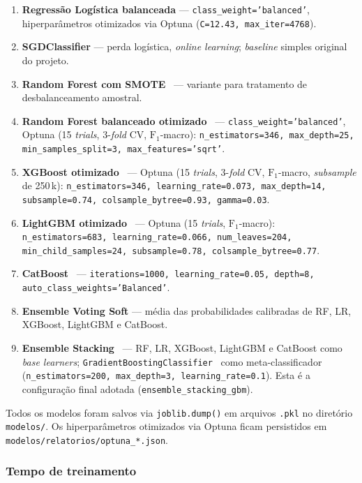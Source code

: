 \begin{enumerate}
  \item \textbf{Regressão Logística balanceada} --- \texttt{class\_weight='balanced'}, hiperparâmetros otimizados via Optuna (\texttt{C=12.43, max\_iter=4768}).
  \item \textbf{SGDClassifier} --- perda logística, \emph{online learning}; \emph{baseline} simples original do projeto.
  \item \textbf{Random Forest com SMOTE}~\cite{chawla2002smote} --- variante para tratamento de desbalanceamento amostral.
  \item \textbf{Random Forest balanceado otimizado}~\cite{breiman2001random} --- \texttt{class\_weight='balanced'}, Optuna (15 \emph{trials}, 3-\emph{fold} CV, \(\text{F}_1\)-macro): \texttt{n\_estimators=346, max\_depth=25, min\_samples\_split=3, max\_features='sqrt'}.
  \item \textbf{XGBoost otimizado}~\cite{chen2016xgboost} --- Optuna (15 \emph{trials}, 3-\emph{fold} CV, \(\text{F}_1\)-macro, \emph{subsample} de 250\,k): \texttt{n\_estimators=346, learning\_rate=0.073, max\_depth=14, subsample=0.74, colsample\_bytree=0.93, gamma=0.03}.
  \item \textbf{LightGBM otimizado}~\cite{ke2017lightgbm} --- Optuna (15 \emph{trials}, \(\text{F}_1\)-macro): \texttt{n\_estimators=683, learning\_rate=0.066, num\_leaves=204, min\_child\_samples=24, subsample=0.78, colsample\_bytree=0.77}.
  \item \textbf{CatBoost}~\cite{prokhorenkova2018catboost} --- \texttt{iterations=1000, learning\_rate=0.05, depth=8, auto\_class\_weights='Balanced'}.
  \item \textbf{Ensemble Voting Soft} --- média das probabilidades calibradas de RF, LR, XGBoost, LightGBM e CatBoost.
  \item \textbf{Ensemble Stacking}~\cite{wolpert1992stacked} --- RF, LR, XGBoost, LightGBM e CatBoost como \emph{base learners}; \texttt{GradientBoostingClassifier}~\cite{friedman2001greedy} como meta-classificador (\texttt{n\_estimators=200, max\_depth=3, learning\_rate=0.1}). Esta é a configuração final adotada (\texttt{ensemble\_stacking\_gbm}).
\end{enumerate}

Todos os modelos foram salvos via \texttt{joblib.dump()} em arquivos \texttt{.pkl} no diretório \texttt{modelos/}. Os hiperparâmetros otimizados via Optuna ficam persistidos em \texttt{modelos/relatorios/optuna\_*.json}.

\subsubsection{Tempo de treinamento}

